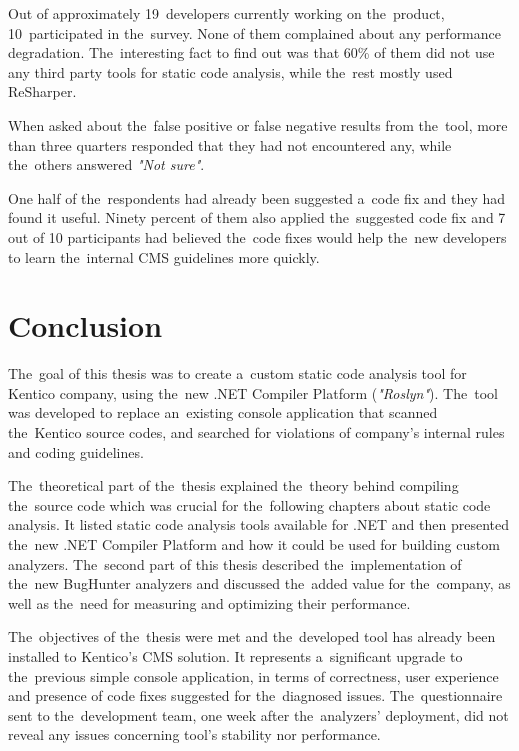\documentclass[
  digital, %
  table,   %
  lof,     %
  lot,     %
  oneside,
]{fithesis3}
\begin{document}
Out of approximately 19~developers currently working on the~product, 10~participated in the~survey. None of them complained about any performance degradation. The~interesting fact to find out was that 60\% of them did not use any third party tools for static code analysis, while the~rest mostly used ReSharper.

When asked about the~false positive or false negative results from the~tool, more than three quarters responded that they had not encountered any, while the~others answered \textit{"Not sure"}.

One half of the~respondents had already been suggested a~code fix and they had found it useful. Ninety percent of them also applied the~suggested code fix and 7 out of 10 participants had believed the~code fixes would help the~new developers to learn the~internal CMS guidelines more quickly.


\chapter{Conclusion}
The~goal of this thesis was to create a~custom static code analysis tool for Kentico company, using the~new .NET Compiler Platform (\textit{"Roslyn"}). The~tool was developed to replace an~existing console application that scanned the~Kentico source codes, and searched for violations of company's internal rules and coding guidelines.

The~theoretical part of the~thesis explained the~theory behind compiling the~source code which was crucial for the~following chapters about static code analysis. It listed static code analysis tools available for .NET and then presented the~new .NET Compiler Platform and how it could be used for building custom  analyzers. The~second part of this thesis described the~implementation of the~new BugHunter analyzers and discussed the~added value for the~company, as well as the~need for measuring and optimizing their performance.

The~objectives of the~thesis were met and the~developed tool has already been installed to Kentico's CMS solution. It represents a~significant upgrade to the~previous simple console application, in terms of correctness, user experience and presence of code fixes suggested for the~diagnosed issues. The~questionnaire sent to the~development team, one week after the~analyzers' deployment, did not reveal any issues concerning tool's stability nor performance.
\end{document}
